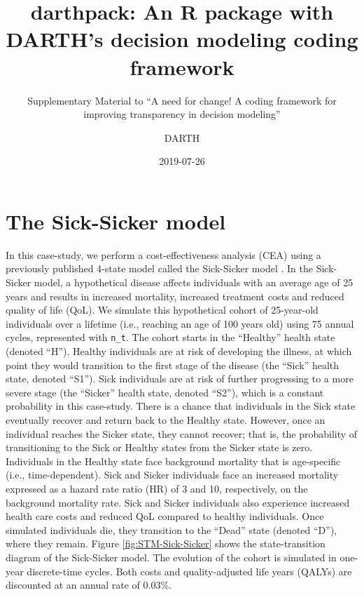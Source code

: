 \documentclass[]{book}
\title{darthpack: An R package with DARTH's decision modeling coding framework}
\subtitle{Supplementary Material to ``A need for change! A coding framework for improving transparency in decision modeling''}
\author{DARTH}
\date{2019-07-26}
\begin{document}
\maketitle

{
\setcounter{tocdepth}{1}
\tableofcontents
}
\hypertarget{the-sick-sicker-model}{%
\chapter*{The Sick-Sicker model}\label{the-sick-sicker-model}}

In this case-study, we perform a cost-effectiveness analysis (CEA) using a previously published 4-state model called the Sick-Sicker model \citep{Enns2015}. In the Sick-Sicker model, a hypothetical disease affects individuals with an average age of 25 years and results in increased mortality, increased treatment costs and reduced quality of life (QoL). We simulate this hypothetical cohort of 25-year-old individuals over a lifetime (i.e., reaching an age of 100 years old) using 75 annual cycles, represented with \texttt{n\_t}. The cohort starts in the ``Healthy'' health state (denoted ``H''). Healthy individuals are at risk of developing the illness, at which point they would transition to the first stage of the disease (the ``Sick'' health state, denoted ``S1''). Sick individuals are at risk of further progressing to a more severe stage (the ``Sicker'' health state, denoted ``S2''), which is a constant probability in this case-study. There is a chance that individuals in the Sick state eventually recover and return back to the Healthy state. However, once an individual reaches the Sicker state, they cannot recover; that is, the probability of transitioning to the Sick or Healthy states from the Sicker state is zero. Individuals in the Healthy state face background mortality that is age-specific (i.e., time-dependent). Sick and Sicker individuals face an increased mortality expressed as a hazard rate ratio (HR) of 3 and 10, respectively, on the background mortality rate. Sick and Sicker individuals also experience increased health care costs and reduced QoL compared to healthy individuals. Once simulated individuals die, they transition to the ``Dead'' state (denoted ``D''), where they remain. Figure \ref{fig:STM-Sick-Sicker} shows the state-transition diagram of the Sick-Sicker model. The evolution of the cohort is simulated in one-year discrete-time cycles. Both costs and quality-adjusted life years (QALYs) are discounted at an annual rate of 0.03\%.
\end{document}
